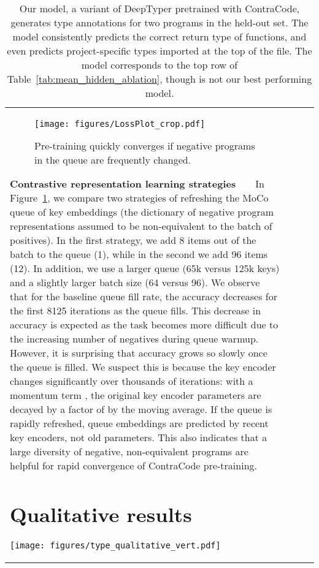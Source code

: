 \documentclass{article}
\newcommand{\ours}[0]{ContraCode}
\begin{document}
\begin{table}[t]
{\begin{tabular}{llcc}
{{\begin{figure}[t]
    \centering
    \texttt{[image: figures/LossPlot\_crop.pdf]}
    \caption{Pre-training quickly converges if negative programs in the queue are frequently changed.}
    \label{fig:constrastive_pretraining_accuracy}
\end{figure}
 
\textbf{Contrastive representation learning strategies}~~~~In Figure~\ref{fig:constrastive_pretraining_accuracy}, we compare two strategies of 
refreshing the MoCo queue of key embeddings (the dictionary of negative program representations assumed to be non-equivalent to the batch of positives). 
In the first strategy, we add 8 items out of the batch to the queue (1), while in the second we add 96 items (12). In addition, we use a larger queue (65k versus 125k keys) and a slightly larger batch size (64 versus 96).
We observe that for the baseline queue fill rate, the accuracy decreases for the first 8125 iterations as the queue fills. This decrease in accuracy is expected as the task becomes more difficult due to the increasing number of negatives during queue warmup. However, it is surprising that accuracy grows so slowly once the queue is filled. 
We suspect this is because the key encoder changes significantly over thousands of iterations: with a momentum term , the original key encoder parameters are decayed by a factor of  by the moving average. If the queue is rapidly refreshed, queue embeddings are predicted by recent key encoders, not old parameters. This also indicates that a large diversity of negative, non-equivalent programs are helpful for rapid convergence of \ours{} pre-training.


\section{Qualitative results}
\label{sec:qualitative}

\begin{figure*}[t!]
    \centering
    \texttt{[image: figures/type\_qualitative\_vert.pdf]}
    \caption{Our model, a variant of DeepTyper pretrained with \ours{}, generates type annotations for two programs in the held-out set. The model consistently predicts the correct return type of functions, and even predicts project-specific types imported at the top of the file. The model corresponds to the top row of Table~\ref{tab:mean_hidden_ablation}, though is not our best performing model.}
    \label{fig:qual_types}
\end{figure*}
 

}}
\end{tabular}}
\end{table}
\end{document}
